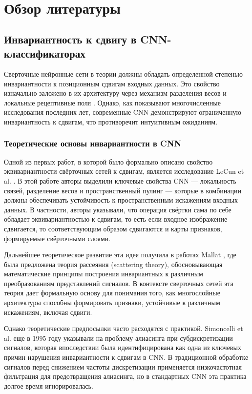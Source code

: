\chapter{Обзор литературы} \label{review}

\section{Инвариантность к сдвигу в CNN-классификаторах}
\label{review:invariance}

Сверточные нейронные сети в теории должны обладать определенной степенью инвариантности к позиционным сдвигам входных данных. Это свойство изначально заложено в их архитектуру через механизм разделения весов и локальные рецептивные поля \cite{LeCun1998}. Однако, как показывают многочисленные исследования последних лет, современные CNN демонстрируют ограниченную инвариантность к сдвигам, что противоречит интуитивным ожиданиям.

\subsection{Теоретические основы инвариантности в CNN}
\label{review:invariance:theory}

Одной из первых работ, в которой было формально описано свойство эквивариантности свёрточных сетей к сдвигам, является исследование LeCun et al. \cite{LeCun1998}. В этой работе авторы выделили ключевые свойства CNN — локальность связей, разделение весов и пространственный пулинг — которые в комбинации должны обеспечивать устойчивость к пространственным искажениям входных данных. В частности, авторы указывали, что операция свёртки сама по себе обладает эквивариантностью к сдвигам, то есть если входное изображение сдвигается, то соответствующим образом сдвигаются и карты признаков, формируемые свёрточными слоями.

Дальнейшее теоретическое развитие эта идея получила в работах Mallat \cite{Mallat2012}, где была предложена теория рассеяния (scattering theory), обосновывающая математические принципы построения инвариантных к различным преобразованиям представлений сигналов. В контексте сверточных сетей эта теория дает формальную основу для понимания того, как многослойные архитектуры способны формировать признаки, устойчивые к различным искажениям, включая сдвиги.

Однако теоретические предпосылки часто расходятся с практикой. Simoncelli et al. \cite{Simoncelli1995} еще в 1995 году указывали на проблему алиасинга при субдискретизации сигналов, которая впоследствии была идентифицирована как одна из ключевых причин нарушения инвариантности к сдвигам в CNN. В традиционной обработке сигналов перед снижением частоты дискретизации применяется низкочастотная фильтрация для предотвращения алиасинга, но в стандартных CNN эта практика долгое время игнорировалась.

